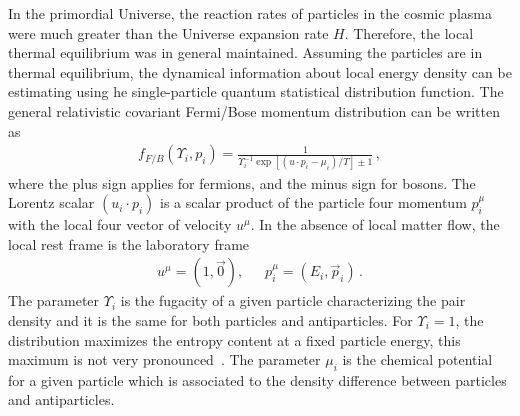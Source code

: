 In the primordial Universe, the reaction rates of particles in the cosmic plasma were much greater than the Universe expansion rate $H$. Therefore, the local thermal equilibrium was in general maintained. Assuming the particles are in thermal equilibrium, the dynamical information about local energy density can be estimating using he single-particle quantum statistical distribution function. The general relativistic covariant Fermi/Bose momentum distribution can be written as
\begin{align}
f_{F/B}(\Upsilon_i,p_i)=\frac{1}{\Upsilon^{-1}_i\exp{\left[(u\cdot p_i-\mu_i)/T\right]}\pm1}
\,,
\end{align}
where the plus sign applies for fermions, and the minus sign for bosons. The Lorentz scalar $(u_i\cdot p_i)$ is a scalar product of the particle four momentum $p^\mu_i$ with the local four vector of velocity $u^\mu$. In the absence of local matter flow, the local rest frame is the laboratory frame 
\begin{align}
u^\mu=\left(1,\vec{0}\right),\,\,\,\,\,\,\,\,\, p^\mu_i=\left(E_i,\vec{p}_i\right)\,.
\end{align} 
The parameter $\Upsilon_i$ is the fugacity of a given particle characterizing the pair density and it is the same for both particles and antiparticles. For $\Upsilon_i=1$, the distribution maximizes the entropy content at a fixed particle energy, this maximum is not very pronounced~\cite{Letessier:1993qa}. The parameter $\mu_i$ is the chemical potential for a given particle which is associated to the density difference between particles and antiparticles.

